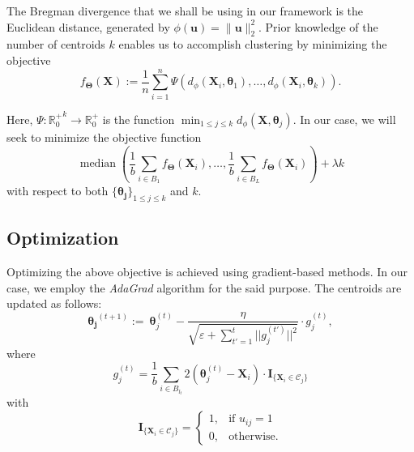 \documentclass[12pt]{article}
\newcommand{\bX}{\boldsymbol{X}}
\begin{document}
The Bregman divergence that we shall be using in our framework is the Euclidean distance, generated by $\phi(\boldsymbol{u})=\|\boldsymbol{u}\|_2^2$. Prior knowledge of the number of centroids $k$ enables us to accomplish clustering by minimizing the objective
\begin{equation}\label{ob}
    f_{\boldsymbol{\Theta}}(\boldsymbol{X}) := \frac{1}{n} \sum_{i=1}^n \Psi\left(d_\phi\left(\boldsymbol{X}_i, \boldsymbol{\theta}_1\right), \ldots, d_\phi\left(\boldsymbol{X}_i, \boldsymbol{\theta}_k\right)\right).
\end{equation}

Here, $\Psi: {\mathbb{R}^{+}_0}^k \rightarrow \mathbb{R}^{+}_0$ is the function $\min_{1\le j\le k} d_{\phi}(\bm{X},\bm{\theta}_j)$. In our case, we will seek to minimize the objective function
\begin{equation}\label{obj}
    \operatorname{median}\left(\frac{1}{b} \sum_{i \in B_1} f_{\boldsymbol{\Theta}}\left(\boldsymbol{X}_i\right), \ldots, \frac{1}{b} \sum_{i \in B_L} f_{\boldsymbol{\Theta}}\left(\boldsymbol{X}_i\right)\right) + \lambda k
\end{equation}
with respect to both $\{\bm{\theta_j}\}_{1\le j\le k}$ and $k$.


\subsection{Optimization}

Optimizing the above objective is achieved using gradient-based methods. In our case, we employ the \textit{AdaGrad} algorithm \cite{duchi2011adaptive} for the said purpose. The centroids are updated as follows:
\begin{equation}
    \boldsymbol{\theta_j}^{(t+1)} := ~\boldsymbol{\theta}_j^{(t)} - \dfrac{\eta}{\sqrt{\varepsilon + \sum_{t' = 1}^t ||g_j^{(t')}||^2}} \cdot g_j^{(t)},
\end{equation}
where 
\begin{equation}
    g_j^{(t)} = \frac{1}{b}\sum_{i \in B_{l_t}} 2(\boldsymbol{\theta}_j^{(t)} - \bX_i)\cdot \mathbf{I}_{\{\bX_i \in \mathcal{C}_j\}}
\end{equation}
with 
\begin{equation}
    \mathbf{I}_{\{\bX_i \in \mathcal{C}_j\}}=\begin{cases}
1, & \text{if $u_{ij} = 1$}\\
0, & \text{otherwise.}
\end{cases}
\end{equation}
\end{document}
